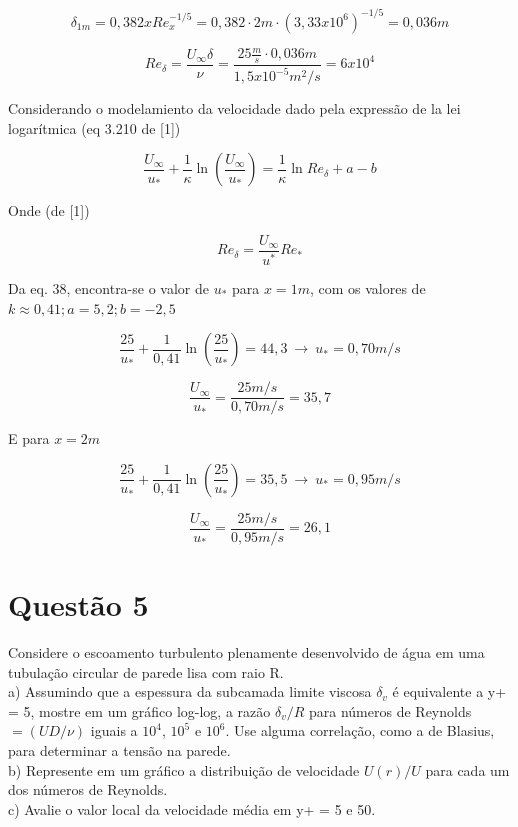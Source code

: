 \documentclass[12pt]{article}
\begin{document}
\begin{equation}
	\delta_{1m}= 0,382 x Re_x^{-1/5} = 0,382 \cdot 2m \cdot (3,33 x 10 ^ {6})^{-1/5} = 0,036 m
\end{equation}

\begin{equation}
	Re_\delta = \frac{U_\infty \delta}{\nu} = \frac{25 \frac{m}{s} \cdot 0,036m}{1,5 x 10 ^{-5} m^2 / s} = 6 x 10 ^ 4
\end{equation}

Considerando o modelamiento da velocidade dado pela expressão de la lei logarítmica (eq 3.210 de [1])

\begin{equation}
	\frac{U_\infty}{u_*} + \frac{1}{\kappa} \ln\left( \frac{U_\infty}{u_*} \right)
	= \frac{1}{\kappa} \ln Re_\delta + a - b
\end{equation}

Onde (de [1])

\begin{equation}
	Re_\delta = \dfrac{U_\infty}{u^*} Re_*
\end{equation}

Da eq. 38, encontra-se o valor de $u_*$ para $x=1m$, com os valores de $k\approx 0,41 ; a = 5,2 ; b = -2,5$

\begin{equation}
	\frac{25}{u_*} + \frac{1}{0,41} \ln\left( \frac{25}{u_*} \right)
	= 44,3\  \rightarrow \ u_*= 0,70 m/s
\end{equation}

\begin{equation}
	\frac{U_\infty}{u_*} = \frac{25 m/s}{0,70m/s} = 35,7
\end{equation}


E para $x = 2m$

\begin{equation}
	\frac{25}{u_*} + \frac{1}{0,41} \ln\left( \frac{25}{u_*} \right)
	= 35,5 \  \rightarrow \ u_*= 0,95 m/s
\end{equation}

\begin{equation}
	\frac{U_\infty}{u_*} = \frac{25 m/s}{0,95m/s} = 26,1
\end{equation}

\section*{Questão 5}

Considere o escoamento turbulento plenamente desenvolvido de água em uma tubulação
circular de parede lisa com raio R.\\
a) Assumindo que a espessura da subcamada limite viscosa $\delta_v$ é equivalente a y+ = 5, mostre
em um gráfico log-log, a razão $\delta_v/R$ para números de Reynolds $=( UD/\nu)$ iguais a $10^4$, $10^5$ e $10^6$. Use alguma correlação, como a de Blasius, para determinar a tensão na parede.\\
b) Represente em um gráfico a distribuição de velocidade $U(r)/U$ para cada um dos números de
Reynolds.\\
c) Avalie o valor local da velocidade média em y+ = 5 e 50.\\
\end{document}

